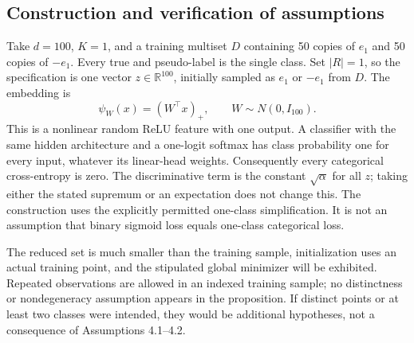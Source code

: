 \documentclass[10pt]{article}
\begin{document}
\subsection*{Construction and verification of assumptions}
Take \(d=100\), \(K=1\), and a training multiset \(D\) containing 50 copies of \(e_1\) and 50 copies of \(-e_1\). Every true and pseudo-label is the single class. Set \(|R|=1\), so the specification is one vector \(z\in\mathbb R^{100}\), initially sampled as \(e_1\) or \(-e_1\) from \(D\). The embedding is \[\psi_W(x)=(W^\top x)_+,\qquad W\sim N(0,I_{100}).\] This is a nonlinear random ReLU feature with one output. A classifier with the same hidden architecture and a one-logit softmax has class probability one for every input, whatever its linear-head weights. Consequently every categorical cross-entropy is zero. The discriminative term is the constant \(\sqrt{\alpha}\) for all \(z\); taking either the stated supremum or an expectation does not change this. The construction uses the explicitly permitted one-class simplification. It is not an assumption that binary sigmoid loss equals one-class categorical loss.\par
The reduced set is much smaller than the training sample, initialization uses an actual training point, and the stipulated global minimizer will be exhibited. Repeated observations are allowed in an indexed training sample; no distinctness or nondegeneracy assumption appears in the proposition. If distinct points or at least two classes were intended, they would be additional hypotheses, not a consequence of Assumptions 4.1–4.2.\par
\end{document}
